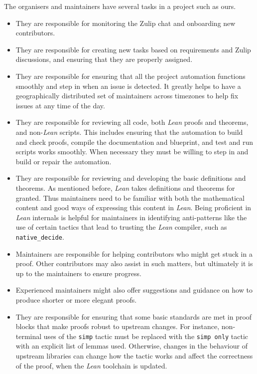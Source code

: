 The organisers and maintainers have several tasks in a project such as ours.
\begin{itemize}
    \item They are responsible for monitoring the Zulip chat and onboarding new contributors.
    \item They are responsible for creating new tasks based on requirements and Zulip discussions, and ensuring that they are properly assigned.
    \item They are responsible for ensuring that all the project automation functions smoothly and step in when an issue is detected. It greatly helps to have a geographically distributed set of maintainers across timezones to help fix issues at any time of the day.
    \item They are responsible for reviewing all code, both \emph{Lean} proofs and theorems, and non-\emph{Lean} scripts. This includes ensuring that the automation to build and check proofs, compile the documentation and blueprint, and test and run scripts works smoothly. When necessary they must be willing to step in and build or repair the automation.
    \item They are responsible for reviewing and developing the basic definitions and theorems. As mentioned before, \emph{Lean} takes definitions and theorems for granted. Thus maintainers need to be familiar with both the mathematical content and good ways of expressing this content in  \emph{Lean}. Being proficient in  \emph{Lean} internals is helpful for maintainers in identifying anti-patterns like the use of certain tactics that lead to trusting the  \emph{Lean} compiler, such as \texttt{native\_decide}.
    \item Maintainers are responsible for helping contributors who might get stuck in a proof. Other contributors may also assist in such matters, but ultimately it is up to the maintainers to ensure progress.
    \item Experienced maintainers might also offer suggestions and guidance on how to produce shorter or more elegant proofs.
    \item They are responsible for ensuring that some basic standards are met in proof blocks that make proofs robust to upstream changes. For instance, non-terminal uses of the \texttt{simp} tactic must be replaced with the \texttt{simp only} tactic with an explicit list of lemmas used. Otherwise, changes in the behaviour of upstream libraries can change how the tactic works and affect the correctness of the proof, when the  \emph{Lean} toolchain is updated.

\end{itemize}
